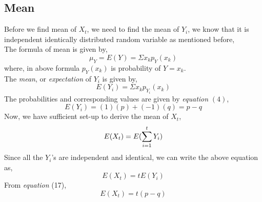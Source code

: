 \documentclass[12pt,a4paper]{article}%
\begin{document}
	 \subsection{Mean}
	 \begin{flushleft}
	 	Before we find mean of $X_{t}$, we need to find the mean of $Y_{i}$, we know that it is independent identically distributed random variable as mentioned before,\\\smallskip
	 	The formula of mean is given by,
	 	\begin{equation}
	 		\mu_{Y}=E(Y)=\Sigma x_{k}p_{Y}(x_{k})
	 	\end{equation}
	 	where, in above formula $p_{Y}(x_{k})$ is probability of $Y=x_{k}$.\\\smallskip
	 	The \textit{mean}, or \textit{expectation} of $Y_{i}$ is given by,
	 	\begin{equation}
	 		E(Y_{i})=\Sigma x_{k}p_{Y_{i}}(x_{k})
	 	\end{equation}
	 	The probabilities and corresponding values are given by \textit{equation} $(4)$,
	 	\begin{equation}
	 		E(Y_{i})=(1)(p)+(-1)(q)=p-q
	 	\end{equation}
	 	Now, we have sufficient set-up to derive the mean of $X_{t}$,
	 	\begin{equation}
	 		E(X_{t}) = E( \sum_{\mathclap{i=1}}^{t} Y_{i})
	 	\end{equation}
	 	Since all the $Y_{i}$'s are independent and identical, we can write the above equation as,
	 	\begin{equation}
	 		E(X_{t}) = tE(Y_{i})
	 	\end{equation}
	 	From \textit{equation} (17),
	 	\begin{equation}
	 		\boxed{E(X_{t})=t(p-q)}
	 	\end{equation}
	 \end{flushleft}
\end{document}
